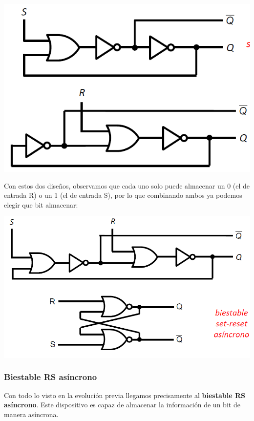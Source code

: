 \documentclass[a4paper,10pt]{book}
\begin{document}
\begin{center}
\includegraphics[scale=0.5]{evolucion3}
\end{center}

Con estos dos diseños, observamos que cada uno solo puede almacenar un 0 (el de entrada R) o un 1 (el de entrada S), por lo que combinando ambos ya podemos elegir que bit almacenar:

\begin{center}
\includegraphics[scale=0.5]{evolucion4}
\end{center}

\subsubsection*{Biestable RS asíncrono}
Con todo lo visto en la evolución previa llegamos precisamente al \textbf{biestable RS asíncrono}. Este dispositivo es capaz de almacenar la información de un bit de manera asíncrona.
\end{document}
